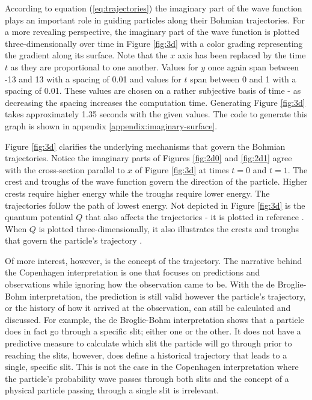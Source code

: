 \documentclass[10pt, reqno]{article}
\begin{document}
  According to equation (\ref{eq:trajectories}) the imaginary part of the wave function plays an important role in guiding particles along their 
    Bohmian trajectories.
  For a more revealing perspective, the imaginary part of the wave function is plotted three-dimensionally over time in Figure \ref{fig:3d}
    with a color grading representing the gradient along its surface.
  Note that the $x$ axis has been replaced by the time $t$ as they are proportional to one another.
  Values for $y$ once again span between -13 and 13 with a spacing of 0.01 and
    values for $t$ span between 0 and 1 with a spacing of 0.01.
  These values are chosen on a rather subjective basis of time - as decreasing the spacing increases the computation time.
  Generating Figure \ref{fig:3d} takes approximately 1.35 seconds with the given values.
  The code to generate this graph is shown in appendix \ref{appendix:imaginary-surface}.

  Figure \ref{fig:3d} clarifies the underlying mechanisms that govern the Bohmian trajectories.
  Notice the imaginary parts of Figures \ref{fig:2d0} and \ref{fig:2d1} agree with the cross-section parallel to $x$ of Figure \ref{fig:3d} at times $t=0$ and $t=1$.
  The crest and troughs of the wave function govern the direction of the particle. 
  Higher crests require higher energy while the troughs require lower energy.
  The trajectories follow the path of lowest energy.
  Not depicted in Figure \ref{fig:3d} is the quantum potential $Q$ that also affects the trajectories - it is plotted in reference \cite{bohm}. 
  When $Q$ is plotted three-dimensionally, it also illustrates the crests and troughs that govern the particle's trajectory \cite{bohm}.

  Of more interest, however, is the concept of the trajectory. 
  The narrative behind the Copenhagen interpretation is one that focuses on predictions and observations while ignoring how the observation came to be.
  With the de Broglie-Bohm interpretation, the prediction is still valid however the particle's trajectory, or the history of how it arrived at the observation, 
    can still be calculated and discussed.
  For example, the de Broglie-Bohm interpretation shows that a particle does in fact go through a specific slit; either one or the other.
  It does not have a predictive measure to calculate which slit the particle will go through prior to reaching the slits, however, does define 
    a historical trajectory that leads to a single, specific slit.
  This is not the case in the Copenhagen interpretation where 
    the particle's probability wave passes through both slits and the concept of a physical particle passing through a single slit is irrelevant.
\end{document}
